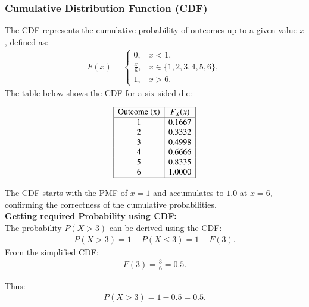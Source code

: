 \documentclass[journal]{IEEEtran}
\begin{document}
\subsubsection*{Cumulative Distribution Function (CDF)}
The CDF represents the cumulative probability of outcomes up to a given value \( x \), defined as:
\begin{align}
F(x) = 
\begin{cases} 
0, & x < 1, \\
\frac{x}{6}, & x \in \{1, 2, 3, 4, 5, 6\}, \\
1, & x > 6.
\end{cases}
\end{align}
The table below shows the CDF for a six-sided die:

\[
\begin{array}{|c|c|}
\hline
\text{Outcome (x)} & F_X(x) \\
\hline
1 & 0.1667 \\
2 & 0.3332 \\
3 & 0.4998 \\
4 & 0.6666 \\
5 & 0.8335 \\
6 & 1.0000 \\
\hline
\end{array}
\]

The CDF starts with the PMF of \(x = 1\) and accumulates to \(1.0\) at \(x = 6\), confirming the correctness of the cumulative probabilities.\\
\textbf{Getting required Probability using CDF:}\\
The probability \( P(X > 3) \) can be derived using the CDF:
\begin{align}
    P(X > 3) = 1 - P(X \leq 3) = 1 - F(3).
\end{align}
From the simplified CDF:
\begin{align}
F(3) = \frac{3}{6} = 0.5.
\end{align}

Thus:
\begin{align}
P(X > 3) = 1 - 0.5 = 0.5.
\end{align}
\end{document}
